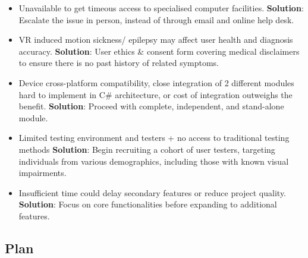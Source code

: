 \documentclass[11pt]{article}
\begin{document}
\begin{itemize}
    \item Unavailable to get timeous access to specialised computer facilities. 
    \newline
    \textbf{Solution}: Escalate the issue in person, instead of through email and online help desk. 
    \item VR induced motion sickness/ epilepsy may affect user health and diagnosis accuracy. \newline
    \textbf{Solution}: User ethics \& consent form covering medical disclaimers to ensure there is no past history of related symptoms.
    \item Device cross-platform compatibility, close integration of 2 different modules hard to implement in C\# architecture, or cost of integration outweighs the benefit.
    \newline
    \textbf{Solution}: Proceed with complete, independent, and stand-alone module.
    \item Limited testing environment and testers + no access to traditional testing methods
    \newline
    \textbf{Solution}: Begin recruiting a cohort of user testers, targeting individuals from various demographics, including those with known visual impairments.
    \item Insufficient time could delay secondary features or reduce project quality.
    \newline
    \textbf{Solution}: Focus on core functionalities before expanding to additional features.
\end{itemize}

\subsection{Plan}\label{plan}
\end{document}
